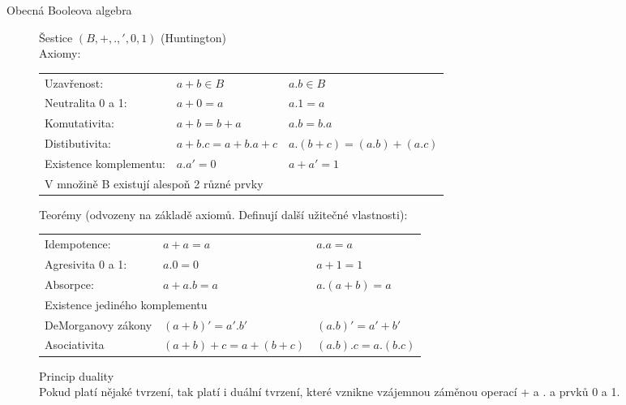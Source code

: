 \documentclass[a4paper, 11pt]{report}
\begin{document}
\begin{description}
	\item[Obecná Booleova algebra] Šestice $(B, +, ., ', 0, 1)$ (Huntington)\\
		Axiomy:\\
		\begin{tabular}{l l l}
			Uzavřenost: 			&$a+b \in B$		&$a.b \in B$	\\
			Neutralita 0 a 1: 		&$a+0 = a$			&$a.1 = a$		\\
			Komutativita: 			&$a+b = b+a$		&$a.b = b.a$	\\
			Distibutivita:	 		&$a+b.c = a+b.a+c$	&$a.(b+c) = (a.b)+(a.c)$\\
			Existence komplementu: 	&$a.a' = 0$			&$a+a' = 1$		\\
			\multicolumn{3}{l}{V množině B existují alespoň 2 různé prvky}
		\end{tabular}
		
		Teorémy (odvozeny na základě axiomů. Definují další užitečné vlastnosti):\\
		\begin{tabular}{l l l}
			Idempotence: 			&$a+a = a$			&$a.a = a$		\\
			Agresivita 0 a 1: 		&$a.0 = 0$			&$a+1 = 1$		\\
			Absorpce: 				&$a+a.b = a$		&$a.(a+b) = a$	\\
			\multicolumn{3}{l}{Existence jediného komplementu}			\\
			DeMorganovy zákony		&$(a+b)' = a'.b'$	&$(a.b)' = a'+b'$\\
			Asociativita			&$(a+b)+c = a+(b+c)$&$(a.b).c = a.(b.c)$\\
		\end{tabular}
		
		Princip duality\\
			Pokud platí nějaké tvrzení, tak platí i duální tvrzení, které vznikne vzájemnou záměnou operací + a . a prvků 0 a 1.


\end{description}
\end{document}
